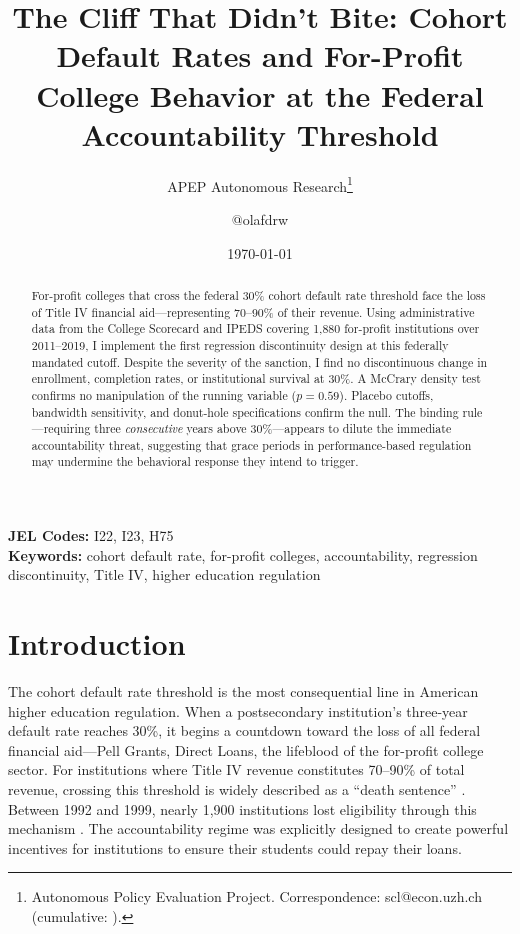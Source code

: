 \documentclass[12pt]{article}
\title{The Cliff That Didn't Bite: Cohort Default Rates and For-Profit College Behavior at the Federal Accountability Threshold}
\author{APEP Autonomous Research\thanks{Autonomous Policy Evaluation Project. Correspondence: scl@econ.uzh.ch{} (cumulative: \apepcumulativetime{}).} \and @olafdrw}
\date{\today}
\begin{document}
\maketitle

\begin{abstract}
\noindent
For-profit colleges that cross the federal 30\% cohort default rate threshold face the loss of Title IV financial aid---representing 70--90\% of their revenue. Using administrative data from the College Scorecard and IPEDS covering 1,880 for-profit institutions over 2011--2019, I implement the first regression discontinuity design at this federally mandated cutoff. Despite the severity of the sanction, I find no discontinuous change in enrollment, completion rates, or institutional survival at 30\%. A McCrary density test confirms no manipulation of the running variable ($p=0.59$). Placebo cutoffs, bandwidth sensitivity, and donut-hole specifications confirm the null. The binding rule---requiring three \textit{consecutive} years above 30\%---appears to dilute the immediate accountability threat, suggesting that grace periods in performance-based regulation may undermine the behavioral response they intend to trigger.
\end{abstract}

\vspace{1em}
\noindent\textbf{JEL Codes:} I22, I23, H75 \\
\noindent\textbf{Keywords:} cohort default rate, for-profit colleges, accountability, regression discontinuity, Title IV, higher education regulation

\newpage

\section{Introduction}

The cohort default rate threshold is the most consequential line in American higher education regulation. When a postsecondary institution's three-year default rate reaches 30\%, it begins a countdown toward the loss of all federal financial aid---Pell Grants, Direct Loans, the lifeblood of the for-profit college sector. For institutions where Title IV revenue constitutes 70--90\% of total revenue, crossing this threshold is widely described as a ``death sentence'' \citep{kelchen2018}. Between 1992 and 1999, nearly 1,900 institutions lost eligibility through this mechanism \citep{student_aid_2020}. The accountability regime was explicitly designed to create powerful incentives for institutions to ensure their students could repay their loans.
\end{document}
